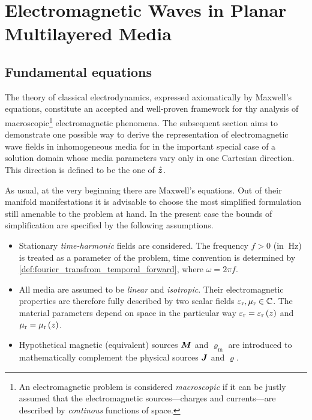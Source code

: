\chapter{Electromagnetic Waves in Planar Multilayered Media}
\label{ch:em_case}







\section{Fundamental equations}
\label{sec:em_fundamental_equations}

The theory of classical electrodynamics, expressed axiomatically by Maxwell's
equations, constitute an accepted and well-proven framework for thy analysis of
macroscopic\footnote{An electromagnetic problem is considered \emph{macroscopic}
if it can be justly assumed that the electromagnetic sources---charges and
currents---are described by \emph{continous} functions of space.}
electromagnetic phenomena.
The subsequent section aims to demonstrate one possible way to derive the
representation of electromagnetic wave fields in inhomogeneous media for in the
important special case of a solution domain whose media parameters vary only in
one Cartesian direction.
This direction is defined to be the one of $\uv{z}$.

As usual, at the very beginning there are Maxwell's equations.
Out of their manifold manifestations it is advisable to choose the most
simplified formulation still amenable to the problem at hand.
In the present case the bounds of simplification are specified by the following
assumptions.
\begin{itemize}
	\item Stationary \emph{time-harmonic} fields are considered.
	The frequency $f > 0$ (in $\SI{}{\hertz}$) is treated as a parameter of the
	problem, time convention is determined by
	\cref{def:fourier_transfrom_temporal_forward}, where $\omega = 2\pi f$.
	\item All media are assumed to be \emph{linear} and \emph{isotropic}.
	Their electromagnetic properties are therefore fully described by two scalar
	fields $\varepsilon_{\mathrm{r}}, \mu_{\mathrm{r}} \in \mathbb{C}$.
	The material parameters depend on space in the particular way
	$\varepsilon_{\mathrm{r}} = \varepsilon_{\mathrm{r}}\left(z\right)$ and $\mu_{\mathrm{r}} = \mu_{\mathrm{r}}\left(z\right)$.
	\item Hypothetical magnetic (equivalent) sources $\pvec{M}$ and
	$\varrho_\mathrm{m}$ are introduced to mathematically complement the
	physical sources $\pvec{J}$ and $\varrho$.
\end{itemize}

